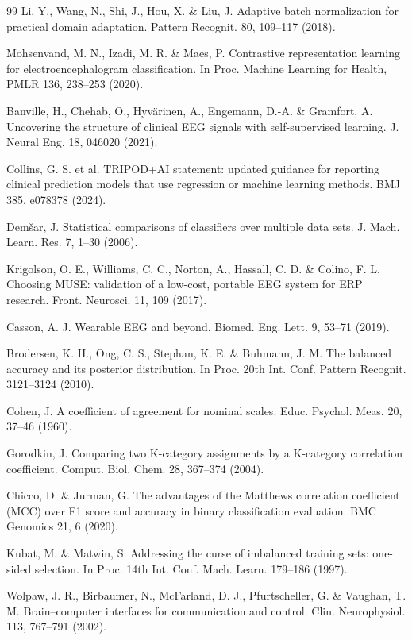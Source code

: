 \begin{thebibliography}{99}
 Li, Y., Wang, N., Shi, J., Hou, X. \& Liu, J. Adaptive batch normalization for practical domain adaptation. Pattern Recognit. 80, 109–117 (2018).

 Mohsenvand, M. N., Izadi, M. R. \& Maes, P. Contrastive representation learning for electroencephalogram classification. In Proc. Machine Learning for Health, PMLR 136, 238–253 (2020).

 Banville, H., Chehab, O., Hyvärinen, A., Engemann, D.-A. \& Gramfort, A. Uncovering the structure of clinical EEG signals with self-supervised learning. J. Neural Eng. 18, 046020 (2021).

 Collins, G. S. et al. TRIPOD+AI statement: updated guidance for reporting clinical prediction models that use regression or machine learning methods. BMJ 385, e078378 (2024).

 Demšar, J. Statistical comparisons of classifiers over multiple data sets. J. Mach. Learn. Res. 7, 1–30 (2006).

 Krigolson, O. E., Williams, C. C., Norton, A., Hassall, C. D. \& Colino, F. L. Choosing MUSE: validation of a low-cost, portable EEG system for ERP research. Front. Neurosci. 11, 109 (2017).

 Casson, A. J. Wearable EEG and beyond. Biomed. Eng. Lett. 9, 53–71 (2019).

 Brodersen, K. H., Ong, C. S., Stephan, K. E. \& Buhmann, J. M. The balanced accuracy and its posterior distribution. In Proc. 20th Int. Conf. Pattern Recognit. 3121–3124 (2010).

 Cohen, J. A coefficient of agreement for nominal scales. Educ. Psychol. Meas. 20, 37–46 (1960).

 Gorodkin, J. Comparing two K-category assignments by a K-category correlation coefficient. Comput. Biol. Chem. 28, 367–374 (2004).

 Chicco, D. \& Jurman, G. The advantages of the Matthews correlation coefficient (MCC) over F1 score and accuracy in binary classification evaluation. BMC Genomics 21, 6 (2020).

 Kubat, M. \& Matwin, S. Addressing the curse of imbalanced training sets: one-sided selection. In Proc. 14th Int. Conf. Mach. Learn. 179–186 (1997).

 Wolpaw, J. R., Birbaumer, N., McFarland, D. J., Pfurtscheller, G. \& Vaughan, T. M. Brain–computer interfaces for communication and control. Clin. Neurophysiol. 113, 767–791 (2002).


\end{thebibliography}
